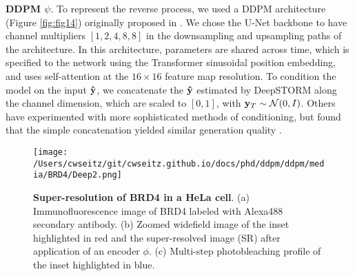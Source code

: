 \textbf{DDPM $\psi$}. To represent the reverse process, we used a DDPM architecture (Figure \ref{fig:fig14}) originally proposed in \parencite{Saharia2021}. We chose the U-Net backbone to have channel multipliers $[1,2,4,8,8]$ in the downsampling and upsampling paths of the architecture. In this architecture, parameters are shared across time, which is specified to the network using the Transformer sinusoidal position embedding, and uses self-attention at the $16 \times 16$ feature map resolution. To condition the model on the input $\bold{\hat{y}}$, we concatenate the $\bold{\hat{y}}$ estimated by DeepSTORM along the channel dimension, which are scaled to $[0,1]$, with $\bold{y}_T\sim \mathcal{N}(0, I)$. Others have experimented with more sophisticated methods of conditioning, but found that the simple concatenation yielded similar generation quality \parencite{Saharia2021}. 

\begin{figure}[t]
\centering
\texttt{[image: /Users/cwseitz/git/cwseitz.github.io/docs/phd/ddpm/ddpm/media/BRD4/Deep2.png]}
\caption{\textbf{Super-resolution of BRD4 in a HeLa cell}. (a) Immunofluorescence image of BRD4 labeled with Alexa488 secondary antibody. (b) Zoomed widefield image of the inset highlighted in red and the super-resolved image (SR) after application of an encoder $\phi$. (c) Multi-step photobleaching profile of the inset highlighted in blue.}
\end{figure}

